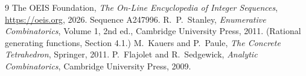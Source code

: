 \documentclass[11pt,a4paper]{article}
\theoremstyle{plain}
\theoremstyle{definition}
\begin{document}
\begin{thebibliography}{9}
 The OEIS Foundation, \emph{The On-Line Encyclopedia of Integer
Sequences}, \url{https://oeis.org}, 2026. Sequence A247996.
 R.~P.~Stanley, \emph{Enumerative Combinatorics}, Volume 1, 2nd ed.,
Cambridge University Press, 2011. (Rational generating functions, Section 4.1.)
 M.~Kauers and P.~Paule, \emph{The Concrete Tetrahedron}, Springer, 2011.
 P.~Flajolet and R.~Sedgewick, \emph{Analytic Combinatorics}, Cambridge
University Press, 2009.
\end{thebibliography}
\end{document}
